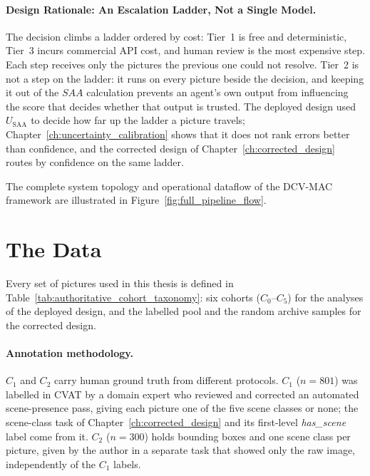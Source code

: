 \documentclass[12pt,a4paper]{report}
\begin{document}
\paragraph{Design Rationale: An Escalation Ladder, Not a Single Model.} The decision climbs a ladder ordered by cost: Tier~1 is free and deterministic, Tier~3 incurs commercial API cost, and human review is the most expensive step. Each step receives only the pictures the previous one could not resolve. Tier~2 is not a step on the ladder: it runs on every picture beside the decision, and keeping it out of the $SAA$ calculation prevents an agent's own output from influencing the score that decides whether that output is trusted. The deployed design used $U_{\text{SAA}}$ to decide how far up the ladder a picture travels; Chapter~\ref{ch:uncertainty_calibration} shows that it does not rank errors better than confidence, and the corrected design of Chapter~\ref{ch:corrected_design} routes by confidence on the same ladder.

The complete system topology and operational dataflow of the DCV-MAC framework are illustrated in Figure~\ref{fig:full_pipeline_flow}.


\section{The Data}
\label{sec:cohort_taxonomy}
Every set of pictures used in this thesis is defined in Table~\ref{tab:authoritative_cohort_taxonomy}: six cohorts ($C_0$--$C_5$) for the analyses of the deployed design, and the labelled pool and the random archive samples for the corrected design.

\paragraph{Annotation methodology.} $C_1$ and $C_2$ carry human ground truth from different protocols. $C_1$ ($n=801$) was labelled in CVAT by a domain expert who reviewed and corrected an automated scene-presence pass, giving each picture one of the five scene classes or none; the scene-class task of Chapter~\ref{ch:corrected_design} and its first-level \textit{has\_scene} label come from it. $C_2$ ($n=300$) holds bounding boxes and one scene class per picture, given by the author in a separate task that showed only the raw image, independently of the $C_1$ labels.
\end{document}
